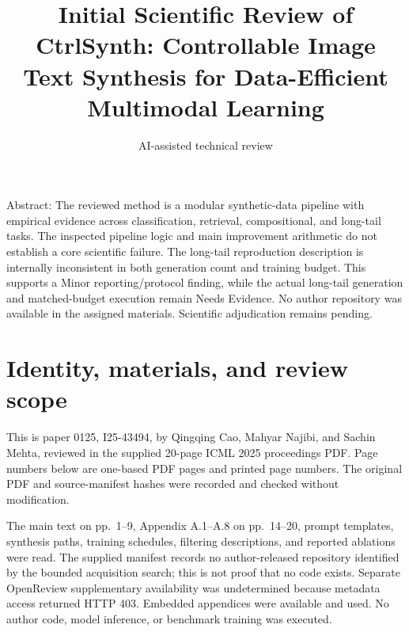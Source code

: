 \documentclass[10pt]{article}
\title{Initial Scientific Review of
CtrlSynth: Controllable Image Text Synthesis
for Data-Efficient Multimodal Learning}
\author{AI-assisted technical review}
\date{}
\begin{document}
\maketitle
Abstract: The reviewed method is a modular synthetic-data pipeline with empirical evidence across classification, retrieval, compositional, and long-tail tasks. The inspected pipeline logic and main improvement arithmetic do not establish a core scientific failure. The long-tail reproduction description is internally inconsistent in both generation count and training budget. This supports a Minor reporting/protocol finding, while the actual long-tail generation and matched-budget execution remain Needs Evidence. No author repository was available in the assigned materials. Scientific adjudication remains pending.\par
\section*{Identity, materials, and review scope}
This is paper 0125, I25-43494, by Qingqing Cao, Mahyar Najibi, and Sachin Mehta, reviewed in the supplied 20-page ICML 2025 proceedings PDF. Page numbers below are one-based PDF pages and printed page numbers. The original PDF and source-manifest hashes were recorded and checked without modification.\par
The main text on pp. 1–9, Appendix A.1–A.8 on pp. 14–20, prompt templates, synthesis paths, training schedules, filtering descriptions, and reported ablations were read. The supplied manifest records no author-released repository identified by the bounded acquisition search; this is not proof that no code exists. Separate OpenReview supplementary availability was undetermined because metadata access returned HTTP 403. Embedded appendices were available and used. No author code, model inference, or benchmark training was executed.\par
\end{document}
